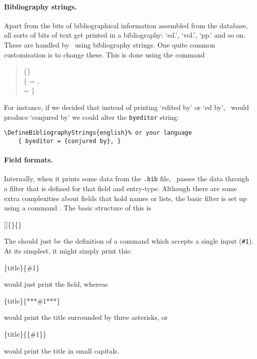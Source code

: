 \paragraph{Bibliography strings.} Apart from the bits
of bibliographical information
assembled from the database, all sorts of bits of text get printed in
a bibliography: `ed.', `vol.', `pp.'  and so on. These are handled by
\biblatex\ using bibliography strings. One quite common customisation
is to change these. This is done using the command
\begin{quotation}
\ttfamily
{}%
  \{\}\\%
  \quad\{ = ,\\
  \quad {} =  \}
\end{quotation} For
instance, if we decided that instead of printing `edited by' or `ed
by', \biblatex\ would produce `conjured by' we could alter the
\verb|byeditor| string:
\begin{verbatim}
\DefineBibliographyStrings{english}% or your language
    { byeditor = {conjured by}, }
\end{verbatim}

\paragraph{Field formats.} Internally, when it prints some data from
the \verb|.bib| file, \biblatex\ passes the data through a filter that
is defined for that field and entry-type. Although there are some
extra complexities about fields that hold names or lists, the basic
filter is set up using a command . The basic
structure of this is
\begin{pseudoverb}
[]\{\}\{\}
\end{pseudoverb}
The  should just be the definition of a command which
accepts a single input (\texttt{\#1}). At its simplest, it
might simply print this:
\begin{pseudoverb}
\{title\}\{\#1\}
\end{pseudoverb}
would just print the field, whereas
\begin{pseudoverb}
\{title\}\{***\#1***\}
\end{pseudoverb}
would print the title surrounded by three asterisks, or
\begin{pseudoverb}
\{title\}\{\{\#1\}\}
\end{pseudoverb}
would print the title in small capitals.

